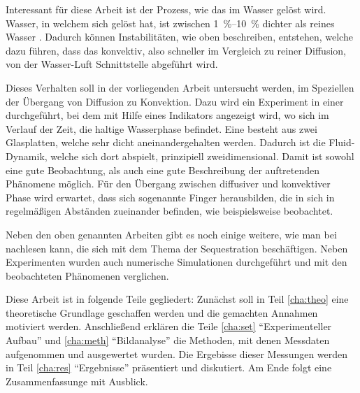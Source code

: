 Interessant für diese Arbeit ist der Prozess, wie das \COT im Wasser gelöst wird. Wasser, in welchem sich \COT gelöst hat, ist zwischen \SIrange{1}{10}{\percent} dichter als reines Wasser \citep{garcia}. Dadurch können Instabilitäten, wie oben beschreiben, entstehen, welche dazu führen, dass das \COT konvektiv, also schneller im Vergleich zu reiner Diffusion, von der Wasser-Luft Schnittstelle abgeführt wird.

Dieses Verhalten soll in der vorliegenden Arbeit untersucht werden, im Speziellen der Übergang von Diffusion zu Konvektion.
Dazu wird ein Experiment in einer \HSC durchgeführt, bei dem mit Hilfe eines Indikators angezeigt wird, wo sich im Verlauf der Zeit, die \COTm haltige Wasserphase befindet. 
Eine \HSC besteht aus zwei Glasplatten, welche sehr dicht aneinandergehalten werden. Dadurch ist die Fluid-Dynamik, welche sich dort abspielt, prinzipiell zweidimensional. Damit ist sowohl eine gute Beobachtung, als auch eine gute Beschreibung der auftretenden Phänomene möglich.
Für den Übergang zwischen diffusiver und konvektiver Phase wird erwartet, dass sich sogenannte Finger herausbilden, die in sich in regelmäßigen Abständen zueinander befinden, wie beispielsweise \cite{fernandez} beobachtet.

Neben den oben genannten Arbeiten gibt es noch einige weitere, wie man bei \cite{kneafsy} nachlesen kann, die sich mit dem Thema der \COTm Sequestration beschäftigen. Neben Experimenten wurden auch numerische Simulationen durchgeführt und mit den beobachteten Phänomenen verglichen. 

Diese Arbeit ist in folgende Teile gegliedert: Zunächst soll in Teil \ref{cha:theo} eine theoretische Grundlage geschaffen werden und die gemachten Annahmen motiviert werden. Anschließend erklären die Teile \ref{cha:set} "`Experimenteller Aufbau"' und \ref{cha:meth} "`Bildanalyse"' die Methoden, mit denen Messdaten aufgenommen und ausgewertet wurden. Die Ergebisse dieser Messungen werden in Teil \ref{cha:res} "`Ergebnisse"' präsentiert und diskutiert. Am Ende folgt eine Zusammenfassunge mit Ausblick.


